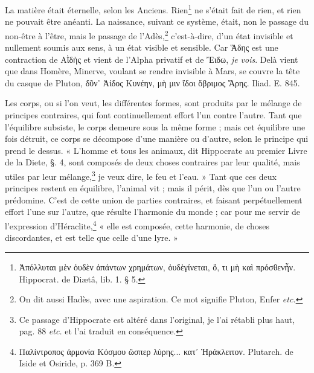 \documentclass[a4paper, 11pt, oneside, polutonikogreek, french]{article}
\begin{document}
La matière était éternelle, selon les Anciens. Rien\footnote{Ἀπόλλυται μὲν ὀυδὲν ἁπάντων χρημάτων, ὀυδὲγίνεται, ὅ, τι μὴ καὶ πρόσθενἦν. Hippocrat. de Diætâ, lib. 1. § 5.} ne s'était fait de rien, et rien ne pouvait être anéanti. La naissance, suivant ce système, était, non le passage du non-être à l'être, mais le passage de l'Adès,\footnote{On dit aussi Hadès, avec une aspiration. Ce mot signifie Pluton, Enfer \emph{etc.}} c'est-à-dire, d'un état invisible et nullement soumis aux sens, à un état visible et sensible. Car Ἅδης est une contraction de Αῒδὴς et vient de l'Alpha privatif et de Ἔιδω, \emph{je vois}. Delà vient que dans Homère, Minerve, voulant se rendre invisible à Mars, se couvre la tête du casque de Pluton, δῦν᾽ Ἀίδος Κυνέην, μὴ μιν ἴδοι ὄβριμος Ἄρης. Iliad. E. 845.

Les corps, ou si l'on veut, les différentes formes, sont produits par le mélange de principes contraires, qui font continuellement effort l'un contre l'autre. Tant que l'équilibre subsiste, le corps demeure sous la même forme ; mais cet équilibre une fois détruit, ce corps se décompose d'une manière ou d'autre, selon le principe qui prend le dessus. « L'homme et tous les animaux, dit Hippocrate au premier Livre de la Diete, §. 4, sont composés de deux choses contraires par leur qualité, mais utiles par leur mélange,\footnote{Ce passage d'Hippocrate est altéré dans l'original, je l'ai rétabli plus haut, pag. 88 \emph{etc.} et l'ai traduit en conséquence.} je veux dire, le feu et l'eau. » Tant que ces deux principes restent en équilibre, l'animal vit ; mais il périt, dès que l'un ou l'autre prédomine. C'est de cette union de parties contraires, et faisant perpétuellement effort l'une sur l'autre, que résulte l'harmonie du monde ; car pour me servir de l'expression d'Héraclite,\footnote{Παλίντροπος ἀρμονία Κόσμου ὥσπερ λύρης... κατ᾽ Ἡράκλειτον. Plutarch. de Iside et Osiride, p. 369 B.} « elle est composée, cette harmonie, de choses discordantes, et est telle que celle d'une lyre. »
\end{document}
